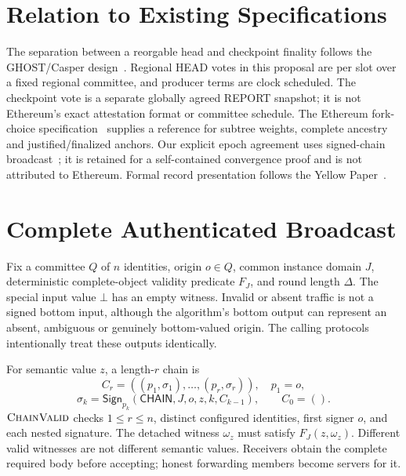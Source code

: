 \documentclass[11pt,a4paper,onecolumn]{article}
\newcommand{\Sig}{\mathsf{Sign}}
\newcommand{\botv}{\bot}
\newcommand{\Tag}[1]{\mathsf{#1}}
\newcommand{\Proc}[1]{\textnormal{\textsc{#1}}}
\theoremstyle{remark}\newtheorem{example}[definition]{Example}
\newcounter{protocol}
\begin{document}
\section*{Relation to Existing Specifications}
The separation between a reorgable head and checkpoint finality follows the
GHOST/Casper design~\cite{gasper,ffg}. Regional HEAD votes in this proposal
are per slot over a fixed regional committee, and producer terms are clock
scheduled. The checkpoint vote is a separate globally agreed REPORT snapshot;
it is not Ethereum's exact attestation format or committee schedule.
The Ethereum fork-choice specification~\cite{ethfork} supplies a reference
for subtree weights, complete ancestry and justified/finalized anchors.
Our explicit epoch agreement uses signed-chain broadcast~\cite{ds}; it is
retained for a self-contained convergence proof and is not attributed to
Ethereum. Formal record presentation follows the Yellow Paper~\cite{yellowpaper}.

\appendix
\section{Complete Authenticated Broadcast}\label{app:ab}
Fix a committee $Q$ of $n$ identities, origin $o\in Q$, common instance domain
$J$, deterministic complete-object validity predicate $F_J$, and round length
$\Delta$. The special input value $\botv$ has an empty witness. Invalid or absent
traffic is not a signed bottom input, although the algorithm's bottom output
can represent an absent, ambiguous or genuinely bottom-valued origin. The
calling protocols intentionally treat these outputs identically.

For semantic value $z$, a length-$r$ chain is
\[
 C_r=((p_1,\sigma_1),\ldots,(p_r,\sigma_r)),\quad p_1=o,
\]
\[
 \sigma_k=\Sig_{p_k}(\Tag{CHAIN},J,o,z,k,C_{k-1}),\qquad C_0=().
\]
$\Proc{ChainValid}$ checks $1\leq r\leq n$, distinct configured identities,
first signer $o$, and each nested signature. The detached witness $\omega_z$
must satisfy $F_J(z,\omega_z)$. Different valid witnesses are not different
semantic values. Receivers obtain the complete required body before accepting;
honest forwarding members become servers for it.
\end{document}

